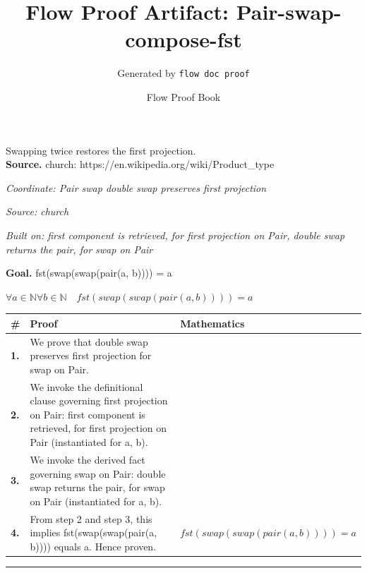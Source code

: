 \documentclass[11pt]{article}
\title{Flow Proof Artifact: Pair-swap-compose-fst}
\author{Generated by \texttt{flow doc proof}}
\date{Flow Proof Book}
\theoremstyle{definition}
\begin{document}
\maketitle
Swapping twice restores the first projection.\\[0.5em]
\textbf{Source.} church: https://en.wikipedia.org/wiki/Product\_type\\[0.5em]
\bigskip
{}\par
\smallskip\noindent\textit{Coordinate: Pair \cdot swap \cdot double swap preserves first projection}\par
\smallskip\noindent\textit{Source: church}\par
\smallskip\noindent\textit{Built on: first component is retrieved, for first projection on Pair, double swap returns the pair, for swap on Pair}\par
\medskip
\noindent\textbf{Goal.} fst(swap(swap(pair(a, b)))) = a\par
\noindent$\displaystyle \forall a \in \mathbb{N} \forall b \in \mathbb{N}\quad fst(swap(swap(pair(a, b)))) = a$\par
\medskip
\noindent
\begin{tabular}{@{} >{\raggedright\arraybackslash}p{} >{\raggedright\arraybackslash}p{} >{\raggedleft\arraybackslash}p{} @{}}
\textbf{\#} & \textbf{Proof} & \textbf{Mathematics} \\
\midrule
\textbf{1.} & We prove that double swap preserves first projection for swap on Pair. & \\[0.45em]
\textbf{2.} & We invoke the definitional clause governing first projection on Pair: first component is retrieved, for first projection on Pair (instantiated for a, b). & \\[0.45em]
\textbf{3.} & We invoke the derived fact governing swap on Pair: double swap returns the pair, for swap on Pair (instantiated for a, b). & \\[0.45em]
\textbf{4.} & From step 2 and step 3, this implies fst(swap(swap(pair(a, b)))) equals a. Hence proven. & $\displaystyle fst(swap(swap(pair(a, b)))) = a$ \\[0.45em]
\bottomrule
\end{tabular}
\label{thm:Pair-swap-double_swap_preserves_first_projection}
\par\medskip\hrule
\end{document}
